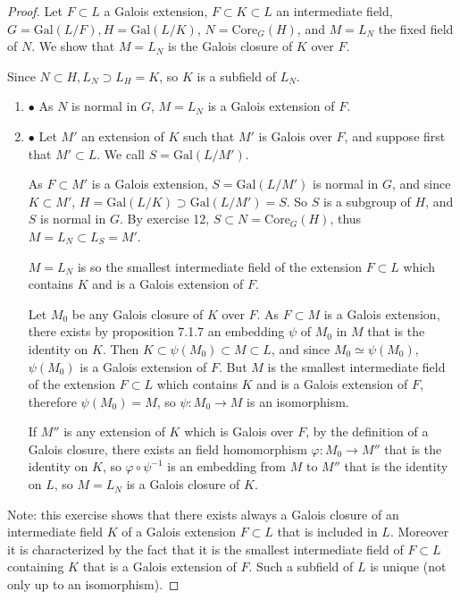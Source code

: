\documentclass[11pt,a4paper]{article}
\newcommand{\be} {\begin{enumerate}}
\newcommand{\ee} {\end{enumerate}}
\newcommand{\Gal}{\mathrm{Gal}}
\begin{document}
\begin{proof}
Let $F \subset L$ a Galois extension, $F \subset K \subset L$ an intermediate field, $G = \Gal(L/F), H =\Gal(L/K)$, 
 $N = \mathrm{Core}_G(H)$, and $M = L_N$ the fixed field of $N$. We show that $M = L_N$ is the Galois closure of $K$ over $F$.

Since $N \subset H, L_N \supset L_H = K$, so $K$ is a subfield of $L_N$.

\be
\item[$\bullet$] As $N$ is normal in $G$, $M = L_N$ is a Galois extension of $F$.

\item[$\bullet$] Let $M'$ an extension of $K$ such that $M'$ is Galois over $F$, and suppose first that $M'\subset L$. We call $S = \Gal(L/M')$.

As $F \subset M'$ is a Galois extension, $S = \Gal(L/M')$ is normal in $G$, and since $K \subset M'$, $H = \Gal(L/K) \supset \Gal(L/M') = S$. So $S$ is a subgroup of $H$, and $S$ is normal in $G$. By exercise 12, $S \subset N = \mathrm{Core}_G(H)$, thus $M = L_N \subset L_S = M'$.

$M=L_N$ is so the smallest intermediate field of the extension $F\subset L$ which contains $K$ and is a Galois extension of $F$.

Let $M_0$ be any Galois closure of $K$ over $F$. As $F \subset M$ is a Galois extension, there exists by proposition 7.1.7 an embedding $\psi$ of $M_0$ in $M$ that is the identity on $K$. Then $K \subset \psi(M_0) \subset M \subset L$, and since $M_0 \simeq \psi(M_0)$, $\psi(M_0)$ is a Galois extension of $F$. But $M$ is the smallest intermediate field of the extension $F\subset L$ which contains $K$ and is a Galois extension of $F$, therefore $\psi(M_0) = M$, so $\psi : M_0 \to M$ is an isomorphism.

If $M''$ is any extension of $K$ which is Galois over $F$, by the definition of a Galois closure, there exists an field homomorphism $\varphi:M_0 \to M''$ that is the identity on $K$, so $\varphi \circ \psi^{-1}$ is an embedding from $M$ to $M''$ that is the identity on $L$, so $M=L_N$ is a Galois closure of $K$.
\ee
Note: this exercise shows that there exists always a Galois closure of an intermediate field $K$ of a Galois extension $F\subset L$ that is included in $L$. Moreover it is characterized by the fact that it is the smallest intermediate field of $F\subset L$ containing $K$ that is a Galois extension of $F$. Such a subfield of $L$ is unique (not only up to an isomorphism). 
\end{proof}
\end{document}
